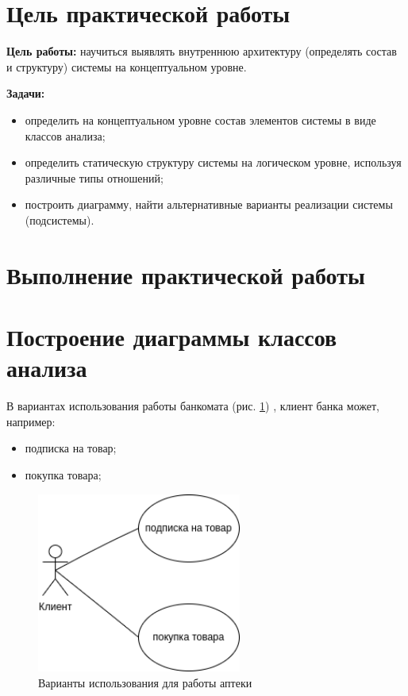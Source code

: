 \graphicspath{{./SecondTask/}} %

\section*{\LARGE Цель практической работы}

\textbf{Цель работы:} научиться выявлять внутреннюю архитектуру (определять
состав и структуру) системы на концептуальном уровне. 

\textbf{Задачи:}\par
\begin{itemize}
	\item определить на концептуальном уровне состав элементов системы
		в виде классов анализа;
	\item определить статическую структуру системы на логическом уровне,
		используя различные типы отношений;
	\item построить диаграмму, найти альтернативные варианты реализации
		системы (подсистемы).
\end{itemize}

\newpage

\section*{\LARGE Выполнение практической работы}
\section{Построение диаграммы классов анализа}
В вариантах использования работы банкомата (рис. \ref{fig:use_case})
, клиент банка может, например:
\begin{itemize}
	\item подписка на товар;
	\item покупка товара;
\end{itemize}
\begin{figure}[h!tp]
	\centering
	\includegraphics[width=0.6\textwidth]{uml_use_case.png}
	\caption{Варианты использования для работы аптеки}
	\label{fig:use_case}
\end{figure}

